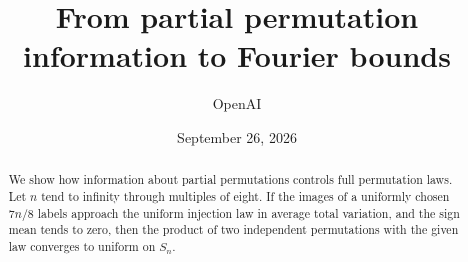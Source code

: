 \documentclass[11pt]{article}
\title{From partial permutation information to Fourier bounds}
\author{OpenAI}
\date{September 26, 2026}
\theoremstyle{definition}\newtheorem{definition}[theorem]{Definition}
\theoremstyle{remark}\newtheorem{remark}[theorem]{Remark}
\numberwithin{equation}{section}
\begin{document}
\maketitle
\begin{abstract}
We show how information about partial permutations controls full permutation laws. Let $n$ tend to infinity through multiples of eight. If the images of a uniformly chosen $7n/8$ labels approach the uniform injection law in average total variation, and the sign mean tends to zero, then the product of two independent permutations with the given law converges to uniform on $S_n$.
\end{abstract}















\appendix




\end{document}
